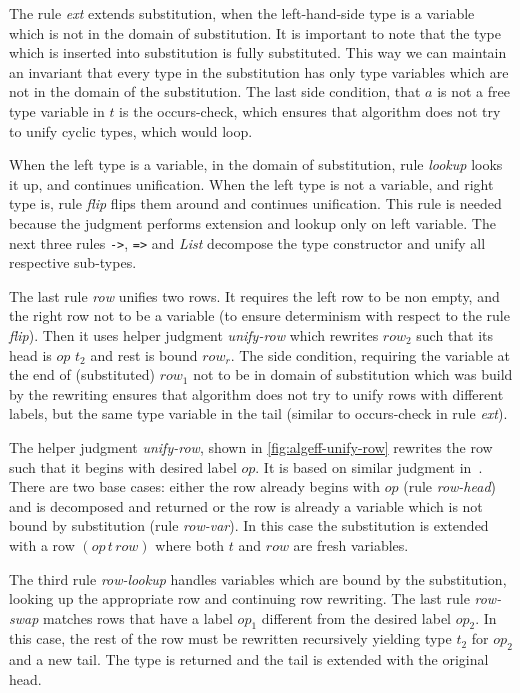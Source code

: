 \documentclass[inz, english, longabstract]{iithesis}
\begin{document}
The rule \emph{ext} extends substitution, when the left-hand-side type is a variable which is not in the domain of substitution.
It is important to note that the type which is inserted into substitution is fully substituted.
This way we can maintain an invariant that every type in the substitution has only type variables which are not in the domain of the substitution.
The last side condition, that $a$ is not a free type variable in $t$ is the occurs-check, which ensures that algorithm does not try to unify cyclic types, which would loop.

When the left type is a variable, in the domain of substitution, rule \emph{lookup} looks it up, and continues unification.
When the left type is not a variable, and right type is, rule \emph{flip} flips them around and continues unification.
This rule is needed because the judgment performs extension and lookup only on left variable.
The next three rules \texttt{->}, \texttt{=>} and \emph{List} decompose the type constructor and unify all respective sub-types.

The last rule \emph{row} unifies two rows.
It requires the left row to be non empty, and the right row not to be a variable (to ensure determinism with respect to the rule \emph{flip}).
Then it uses helper judgment \emph{unify-row} which rewrites $row_2$ such that its head is $op \, \, t_2$ and rest is bound $row_r$.
The side condition, requiring the variable at the end of (substituted) $row_1$ not to be in domain of substitution which was build by the rewriting ensures that algorithm does not try to unify rows with different labels, but the same type variable in the tail (similar to occurs-check in rule \emph{ext}).

The helper judgment \emph{unify-row}, shown in \autoref{fig:algeff-unify-row} rewrites the row such that it begins with desired label $op$.
It is based on similar judgment in~\cite{Leijen2005}.
There are two base cases: either the row already begins with $op$ (rule \emph{row-head}) and is decomposed and returned or the row is already a variable which is not bound by substitution (rule \emph{row-var}).
In this case the substitution is extended with a row $(op \, t \, row)$ where both $t$ and $row$ are fresh variables.

The third rule \emph{row-lookup} handles variables which are bound by the substitution, looking up the appropriate row and continuing row rewriting.
The last rule \emph{row-swap} matches rows that have a label $op_1$ different from the desired label $op_2$.
In this case, the rest of the row must be rewritten recursively yielding type $t_2$ for $op_2$ and a new tail.
The type is returned and the tail is extended with the original head.
\end{document}
